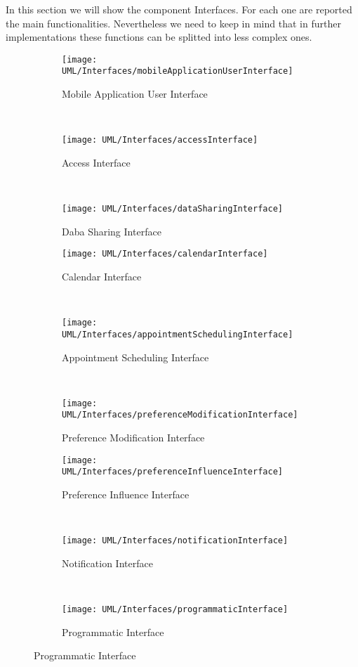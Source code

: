 In this section we will show the component Interfaces. For each one are reported the main functionalities.
Nevertheless we need to keep in mind that in further implementations these functions can be splitted into less complex ones.

\begin{figure}[H]

	\begin{subfigure}[t]{0.3\linewidth}
		\centering
		\texttt{[image: UML/Interfaces/mobileApplicationUserInterface]}
		\caption{Mobile Application User Interface}
	\end{subfigure}
	~
	\begin{subfigure}[t]{0.3\linewidth}
		\centering
		\texttt{[image: UML/Interfaces/accessInterface]}
		\caption{Access Interface}
	\end{subfigure}
	~	
	\begin{subfigure}[t]{0.3\linewidth}
		\centering
		\texttt{[image: UML/Interfaces/dataSharingInterface]}
		\caption{Daba Sharing Interface}
	\end{subfigure}
	\hfill
	\vskip0.75cm
	
	
	\begin{subfigure}[t]{0.3\linewidth}
		\centering
		\texttt{[image: UML/Interfaces/calendarInterface]}
		\caption{Calendar Interface}
	\end{subfigure}
	~
	\begin{subfigure}[t]{0.3\linewidth}
		\centering
		\texttt{[image: UML/Interfaces/appointmentSchedulingInterface]}
		\caption{Appointment Scheduling Interface}
	\end{subfigure}
	~
	\begin{subfigure}[t]{0.3\linewidth}
		\centering
		\texttt{[image: UML/Interfaces/preferenceModificationInterface]}
	\caption{Preference Modification Interface}
	\end{subfigure}
	\hfill
	\vskip0.75cm
	
	
	\begin{subfigure}[t]{0.3\linewidth}
		\centering
		\texttt{[image: UML/Interfaces/preferenceInfluenceInterface]}
		\caption{Preference Influence Interface}
	\end{subfigure}
	~
	\begin{subfigure}[t]{0.3\linewidth}
		\centering
		\texttt{[image: UML/Interfaces/notificationInterface]}
		\caption{Notification Interface}
	\end{subfigure}
	~
	\begin{subfigure}[t]{0.3\linewidth}
		\centering
		\texttt{[image: UML/Interfaces/programmaticInterface]}
		\caption{Programmatic Interface}
	\end{subfigure}
\end{figure}	


